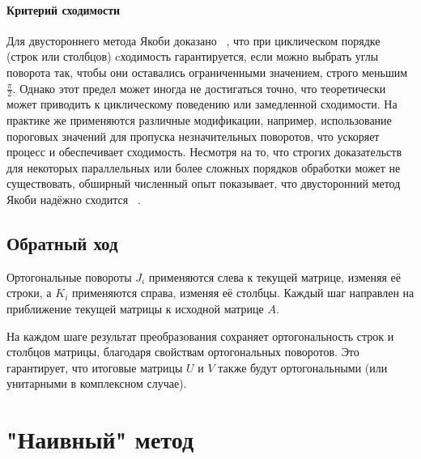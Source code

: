 \paragraph{Критерий сходимости}
Для двустороннего метода Якоби доказано ~\cite{Forsythe1960}, что при циклическом порядке (строк или столбцов) cходимость гарантируется, если можно выбрать углы поворота так, чтобы они оставались ограниченными значением, строго меньшим $\frac{\pi}{2}$. Однако этот предел может иногда не достигаться точно, что теоретически может приводить к циклическому поведению или замедленной сходимости. На практике же применяются различные модификации, например, использование пороговых значений для пропуска незначительных поворотов, что ускоряет процесс и обеспечивает сходимость. Несмотря на то, что строгих доказательств для некоторых параллельных или более сложных порядков обработки может не существовать, обширный численный опыт показывает, что двусторонний метод Якоби надёжно сходится ~\cite{Dongarra2018}.

\subsection{Обратный ход}


Ортогональные повороты \( J_i \) применяются слева к текущей матрице, изменяя её строки, а \( K_i \) применяются справа, изменяя её столбцы. Каждый шаг направлен на приближение текущей матрицы к исходной матрице \( A \).

На каждом шаге результат преобразования сохраняет ортогональность строк и столбцов матрицы, благодаря свойствам ортогональных поворотов. Это гарантирует, что итоговые матрицы \( U \) и \( V \) также будут ортогональными (или унитарными в комплексном случае).




\newpage
\section{"Наивный" метод}

